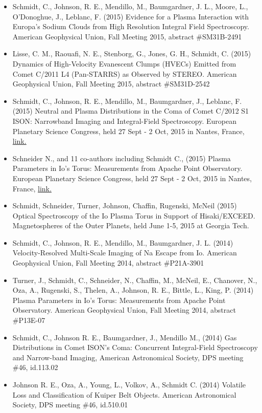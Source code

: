 \documentclass[12pt]{report}
\begin{document}
\begin{itemize}
   \item Schmidt, C., Johnson, R. E., Mendillo, M., Baumgardner, J. L., Moore, L., O'Donoghue, J., Leblanc, F. (2015) Evidence for a Plasma Interaction with Europa's Sodium Clouds from High Resolution Integral Field Spectroscopy. American Geophysical Union, Fall Meeting 2015, abstract \#SM31B-2491
   \item Lisse, C. M., Raouafi, N. E., Stenborg, G., Jones, G. H., Schmidt, C. (2015) Dynamics of High-Velocity Evanescent Clumps (HVECs) Emitted from Comet C/2011 L4 (Pan-STARRS) as Observed by STEREO. American Geophysical Union, Fall Meeting 2015, abstract \#SM31D-2542
   \item Schmidt, C., Johnson, R. E., Mendillo, M., Baumgardner, J., Leblanc, F. (2015) Neutral and Plasma Distributions in the Coma of Comet C/2012 S1 ISON: Narrowband Imaging and Integral-Field Spectroscopy. European Planetary Science Congress, held 27 Sept - 2 Oct, 2015 in Nantes, France, \href{https://meetingorganizer.copernicus.org/EPSC2015/EPSC2015-315-2.pdf}{link.} 
   \item Schneider N., and 11 co-authors including Schmidt C., (2015) Plasma Parameters in Io's Torus: Measurements from Apache Point Observatory. European Planetary Science Congress, held 27 Sept - 2 Oct, 2015 in Nantes, France, \href{https://meetingorganizer.copernicus.org/EPSC2015/EPSC2015-418-1.pdf}{link.} 
   \item Schmidt, Schneider, Turner, Johnson, Chaffin, Rugenski, McNeil (2015) Optical Spectroscopy of the Io Plasma Torus in Support of Hisaki/EXCEED. Magnetospheres of the Outer Planets, held June 1-5, 2015 at Georgia Tech.
   \item Schmidt, C., Johnson, R. E., Mendillo, M., Baumgardner, J. L. (2014) Velocity-Resolved Multi-Scale Imaging of Na Escape from Io. American Geophysical Union, Fall Meeting 2014, abstract \#P21A-3901
   \item Turner, J., Schmidt, C., Schneider, N., Chaffin, M., McNeil, E., Chanover, N., Oza, A., Rugenski, S., Thelen, A., Johnson, R. E., Bittle, L., King, P. (2014) Plasma Parameters in Io's Torus: Measurements from Apache Point Observatory. American Geophysical Union, Fall Meeting 2014, abstract \#P13E-07
   \item Schmidt, C., Johnson R. E., Baumgardner, J., Mendillo M., (2014) Gas Distributions in Comet ISON's Coma: Concurrent Integral-Field Spectroscopy and Narrow-band Imaging, American Astronomical Society, DPS meeting \#46, id.113.02
   \item Johnson R. E., Oza, A., Young, L., Volkov, A., Schmidt C. (2014) Volatile Loss and Classification of Kuiper Belt Objects. American Astronomical Society, DPS meeting \#46, id.510.01

\end{itemize}
\end{document}
